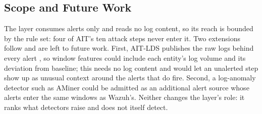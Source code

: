 \documentclass[conference]{IEEEtran}
\begin{document}
\subsection{Scope and Future Work}

The layer consumes alerts only and reads no log content, so its reach is bounded by the rule set: four of AIT's ten attack steps never enter it. Two extensions follow and are left to future work. First, AIT-LDS publishes the raw logs behind every alert \cite{ref22}, so window features could include each entity's log volume and its deviation from baseline; this needs no log content and would let an unalerted step show up as unusual context around the alerts that do fire. Second, a log-anomaly detector such as AMiner could be admitted as an additional alert source whose alerts enter the same windows as Wazuh's. Neither changes the layer's role: it ranks what detectors raise and does not itself detect.
\end{document}
